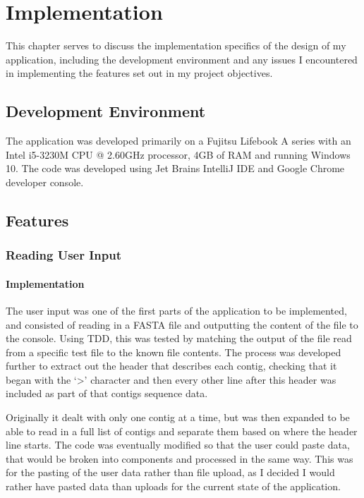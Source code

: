 \chapter{Implementation}
This chapter serves to discuss the implementation specifics of the design of my application, including the development environment and any issues I encountered in implementing the features set out in my project objectives.

\section{Development Environment}
The application was developed primarily on a Fujitsu Lifebook A series with an Intel i5-3230M CPU @ 2.60GHz processor, 4GB of RAM and running Windows 10. The code was developed using Jet Brains IntelliJ IDE and Google Chrome developer console.

\section{Features}
\subsection{Reading User Input}
\subsubsection{Implementation}
The user input was one of the first parts of the application to be implemented, and consisted of reading in a FASTA file and outputting the content of the file to the console. Using TDD, this was tested by matching the output of the file read from a specific test file to the known file contents. The process was developed further to extract out the header that describes each contig, checking that it began with the `\textgreater ' character and then every other line after this header was included as part of that contigs sequence data. 

Originally it dealt with only one contig at a time, but was then expanded to be able to read in a full list of contigs and separate them based on where the header line starts. The code was eventually modified so that the user could paste data, that would be broken into components and processed in the same way. This was for the pasting of the user data rather than file upload, as I decided I would rather have pasted data than uploads for the current state of the application.

